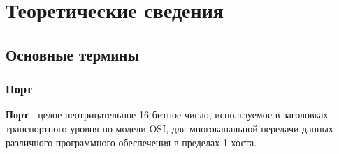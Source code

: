 \hypertarget{ux442ux435ux43eux440ux435ux442ux438ux447ux435ux441ux43aux438ux435-ux441ux432ux435ux434ux435ux43dux438ux44f}{%
\section{Теоретические
сведения}\label{ux442ux435ux43eux440ux435ux442ux438ux447ux435ux441ux43aux438ux435-ux441ux432ux435ux434ux435ux43dux438ux44f}}

\hypertarget{ux43eux441ux43dux43eux432ux43dux44bux435-ux442ux435ux440ux43cux438ux43dux44b}{%
\subsection{Основные
термины}\label{ux43eux441ux43dux43eux432ux43dux44bux435-ux442ux435ux440ux43cux438ux43dux44b}}

\hypertarget{ux43fux43eux440ux442}{%
\subsubsection{Порт}\label{ux43fux43eux440ux442}}

\textbf{Порт} - целое неотрицательное 16 битное число, используемое в
заголовках транспортного уровня по модели OSI, для многоканальной
передачи данных различного программного обеспечения в пределах 1 хоста.
